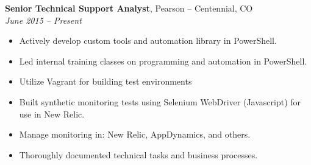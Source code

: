 {\bf Senior Technical Support Analyst}, Pearson – Centennial, CO\\
{\it June 2015 – Present}
\begin{itemize}
	\item Actively develop custom tools and automation library in PowerShell.
	\item Led internal training classes on programming and automation in PowerShell.
	\item Utilize Vagrant for building test environments
	\item Built synthetic monitoring tests using Selenium WebDriver (Javascript) for use in New Relic.
	\item Manage monitoring in: New Relic, AppDynamics, and others.
	\item Thoroughly documented technical tasks and business processes.
\end{itemize}